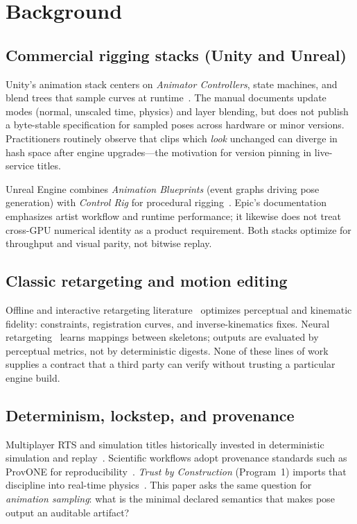 \documentclass[sigconf,nonacm]{acmart}
\begin{document}
\section{Background}
\label{sec:bg}

\subsection{Commercial rigging stacks (Unity and Unreal)}
Unity's animation stack centers on \emph{Animator Controllers}, state machines,
and blend trees that sample curves at runtime~\cite{unity-mecanim-manual}.
The manual documents update modes (normal, unscaled time, physics) and
layer blending, but does not publish a byte-stable specification for sampled
poses across hardware or minor versions. Practitioners routinely observe that
clips which \emph{look} unchanged can diverge in hash space after engine
upgrades---the motivation for version pinning in live-service titles.

Unreal Engine combines \emph{Animation Blueprints} (event graphs driving pose
generation) with \emph{Control Rig} for procedural
rigging~\cite{unreal-control-rig-doc,unreal-animation-blueprints}. Epic's
documentation emphasizes artist workflow and runtime performance; it likewise
does not treat cross-GPU numerical identity as a product requirement. Both
stacks optimize for throughput and visual parity, not bitwise replay.

\subsection{Classic retargeting and motion editing}
Offline and interactive retargeting literature~\cite{gleicher-retargeting1998,kovar-gleicher2004}
optimizes perceptual and kinematic fidelity: constraints, registration curves,
and inverse-kinematics fixes. Neural retargeting~\cite{aberman-skin2020} learns
mappings between skeletons; outputs are evaluated by perceptual metrics, not by
deterministic digests. None of these lines of work supplies a contract that a
third party can verify without trusting a particular engine build.

\subsection{Determinism, lockstep, and provenance}
Multiplayer RTS and simulation titles historically invested in
deterministic simulation and replay~\cite{lockstep2001}. Scientific workflows
adopt provenance standards such as ProvONE for
reproducibility~\cite{provone2014}. \emph{Trust by Construction} (Program~1)
imports that discipline into real-time physics~\cite{trustbyconstruction2026}.
This paper asks the same question for \emph{animation sampling}: what is the
minimal declared semantics that makes pose output an auditable artifact?
\end{document}

